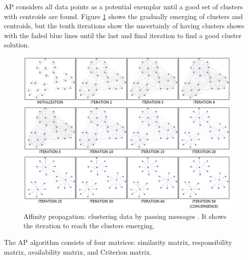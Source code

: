 \documentclass[../UNBThesis2.tex]{subfiles}
\begin{document}
AP considers all data points as a potential exemplar until a good set of clusters with centroids are found. Figure \ref{APPi} shows the gradually emerging of clusters and centroids, but the tenth iterations show the uncertainly of having clusters shows with the faded blue lines until the last and final iteration to find a good cluster solution.

\begin{figure}
\centering
\includegraphics[width = 13 cm]{image/Chapters/Chapter2/APDurek.PNG}
\caption{Affinity propagation: clustering data by passing messages \protect\cite{dueck2009affinity}. It shows the iteration to reach the clusters emerging.}
\label{APPi}
\end{figure}


The AP algorithm consists of four matrices: similarity matrix, responsibility matrix, availability matrix, and Criterion matrix.
\end{document}
